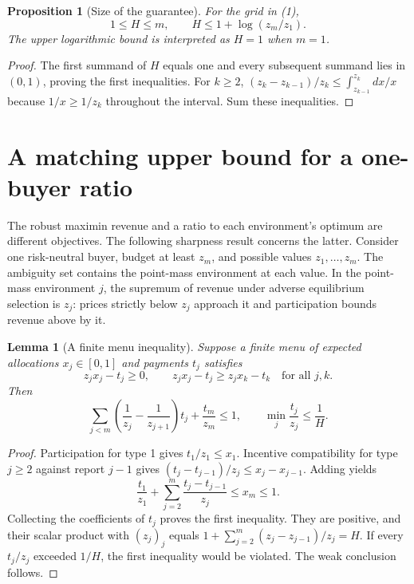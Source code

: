 \documentclass[11pt]{article}
\newtheorem{lemma}[theorem]{Lemma}
\newtheorem{proposition}[theorem]{Proposition}
\theoremstyle{remark}\newtheorem{remark}[theorem]{Remark}
\begin{document}
\begin{proposition}[Size of the guarantee]\label{prop:H}
For the grid in (1),
\[
 1\leq H\leq m,\qquad H\leq1+\log(z_m/z_1).
\]
The upper logarithmic bound is interpreted as $H=1$ when $m=1$.
\end{proposition}
\begin{proof}
The first summand of $H$ equals one and every subsequent summand lies in $(0,1)$, proving the first inequalities. For $k\geq2$,
$(z_k-z_{k-1})/z_k\leq\int_{z_{k-1}}^{z_k}dx/x$ because $1/x\geq1/z_k$ throughout the interval. Sum these inequalities.
\end{proof}

\section*{A matching upper bound for a one-buyer ratio}
The robust maximin revenue and a ratio to each environment's optimum are different objectives. The following sharpness result concerns the latter. Consider one risk-neutral buyer, budget at least $z_m$, and possible values $z_1,\ldots,z_m$. The ambiguity set contains the point-mass environment at each value. In the point-mass environment $j$, the supremum of revenue under adverse equilibrium selection is $z_j$: prices strictly below $z_j$ approach it and participation bounds revenue above by it.

\begin{lemma}[A finite menu inequality]\label{lem:menu}
Suppose a finite menu of expected allocations $x_j\in[0,1]$ and payments $t_j$ satisfies
\[
 z_jx_j-t_j\geq0,\qquad
 z_jx_j-t_j\geq z_jx_k-t_k\quad\text{for all }j,k.
\]
Then
\[
 \sum_{j<m}\left(\frac1{z_j}-\frac1{z_{j+1}}\right)t_j
       +\frac{t_m}{z_m}\leq1,
 \qquad \min_j\frac{t_j}{z_j}\leq\frac1H.                       \tag{3}
\]
\end{lemma}
\begin{proof}
Participation for type 1 gives $t_1/z_1\leq x_1$. Incentive compatibility for type $j\geq2$ against report $j-1$ gives
$(t_j-t_{j-1})/z_j\leq x_j-x_{j-1}$. Adding yields
\[
 \frac{t_1}{z_1}+\sum_{j=2}^m\frac{t_j-t_{j-1}}{z_j}\leq x_m\leq1.
\]
Collecting the coefficients of $t_j$ proves the first inequality. They are positive, and their scalar product with $(z_j)_j$ equals
$1+\sum_{j=2}^m(z_j-z_{j-1})/z_j=H$. If every $t_j/z_j$ exceeded $1/H$, the first inequality would be violated. The weak conclusion follows.
\end{proof}
\end{document}
